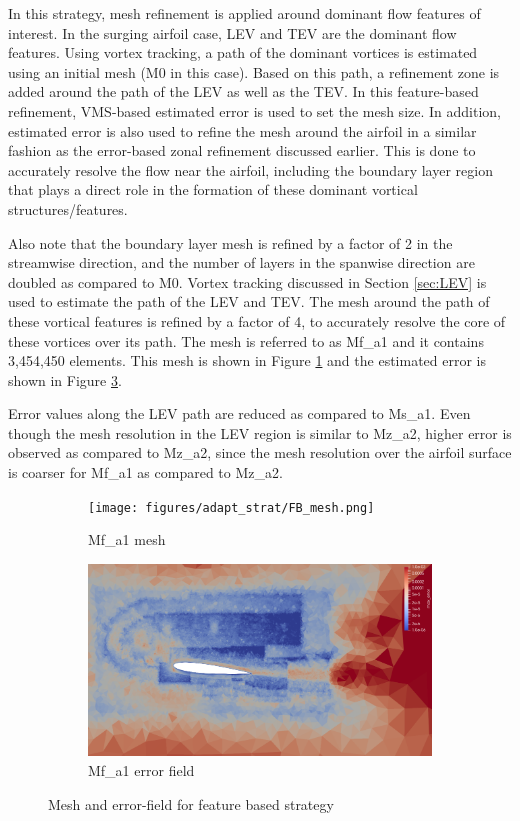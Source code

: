 In this strategy, mesh refinement is applied around dominant flow features of interest. In the surging airfoil case, LEV and TEV are the dominant flow features. Using vortex tracking, a path of the dominant vortices is estimated using an initial mesh (M0 in this case). Based on this path, a refinement zone is added around the path of the LEV as well as the TEV. In this feature-based refinement, VMS-based estimated error is used to set the mesh size. In addition, estimated error is also used to refine the mesh around the airfoil in a similar fashion as the error-based zonal refinement discussed earlier. This is done to accurately resolve the flow near the airfoil, including the boundary layer region that plays a direct role in the formation of these dominant vortical structures/features.

Also note that the boundary layer mesh is refined by a factor of 2 in the streamwise direction, and the number of layers in the spanwise direction are doubled as compared to M0.  
Vortex tracking discussed in Section \ref{sec:LEV} is used to estimate the path of the LEV and TEV. The mesh around the path of these vortical features is refined by a factor of 4, to accurately resolve the core of these vortices over its path. 
The mesh is referred to as Mf\_a1 and it contains 3,454,450 elements.
This mesh is shown in Figure \ref{fig:FB_mesh} and the estimated error is shown in Figure \ref{fig:FB_error_plot}.

Error values along the LEV path are reduced as compared to Ms\_a1. Even though the mesh resolution in the LEV region is similar to Mz\_a2, higher error is observed as compared to Mz\_a2, since the mesh resolution over the airfoil surface is coarser for Mf\_a1 as compared to Mz\_a2.

\begin{figure}[H]
\centering

\begin{subfigure}[b]{0.475\textwidth}
\centering
\texttt{[image: figures/adapt\_strat/FB\_mesh.png]}
\caption{Mf\_a1 mesh}
\label{fig:FB_mesh}
\end{subfigure}
\begin{subfigure}[b]{0.475\textwidth}
\centering
\includegraphics[width=1\textwidth]{figures/adapt_strat/FB_error_plot.png}
\caption{Mf\_a1 error field}
\label{fig:FB_error_plot}
\end{subfigure}

\caption{Mesh and error-field for feature based strategy}
\end{figure}